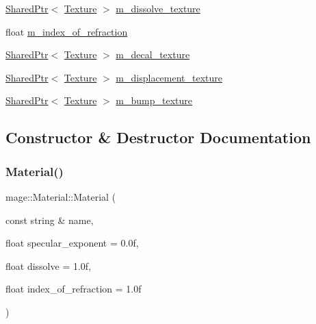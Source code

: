 \begin{DoxyCompactItemize}
\item 
\hyperlink{namespacemage_a1e01ae66713838a7a67d30e44c67703e}{Shared\+Ptr}$<$ \hyperlink{classmage_1_1_texture}{Texture} $>$ \hyperlink{structmage_1_1_material_aa68e02ed3da6000effc3aadcc99fa4b5}{m\+\_\+dissolve\+\_\+texture}
\item 
float \hyperlink{structmage_1_1_material_a8b584541ab8bfc527f856c68bb0152e7}{m\+\_\+index\+\_\+of\+\_\+refraction}
\item 
\hyperlink{namespacemage_a1e01ae66713838a7a67d30e44c67703e}{Shared\+Ptr}$<$ \hyperlink{classmage_1_1_texture}{Texture} $>$ \hyperlink{structmage_1_1_material_acdab45e5d78ddbb7f717d9db67ff3fcf}{m\+\_\+decal\+\_\+texture}
\item 
\hyperlink{namespacemage_a1e01ae66713838a7a67d30e44c67703e}{Shared\+Ptr}$<$ \hyperlink{classmage_1_1_texture}{Texture} $>$ \hyperlink{structmage_1_1_material_a04ca0a2efe12529ae0ea91e9cb622ade}{m\+\_\+displacement\+\_\+texture}
\item 
\hyperlink{namespacemage_a1e01ae66713838a7a67d30e44c67703e}{Shared\+Ptr}$<$ \hyperlink{classmage_1_1_texture}{Texture} $>$ \hyperlink{structmage_1_1_material_aa69355550fbcf2230442e53d71d4ebc6}{m\+\_\+bump\+\_\+texture}
\end{DoxyCompactItemize}


\subsection{Constructor \& Destructor Documentation}
\hypertarget{structmage_1_1_material_ace4a06c8c8c4e75d82e701443f88d1d3}{}\label{structmage_1_1_material_ace4a06c8c8c4e75d82e701443f88d1d3} 
\subsubsection{\texorpdfstring{Material()}{Material()}\hspace{0.1cm}{\footnotesize\ttfamily [1/3]}}
{\footnotesize\ttfamily mage\+::\+Material\+::\+Material (\begin{DoxyParamCaption}\item[{const string \&}]{name,  }\item[{float}]{specular\+\_\+exponent = {\ttfamily 0.0f},  }\item[{float}]{dissolve = {\ttfamily 1.0f},  }\item[{float}]{index\+\_\+of\+\_\+refraction = {\ttfamily 1.0f} }\end{DoxyParamCaption})\hspace{0.3cm}{\ttfamily [explicit]}}

